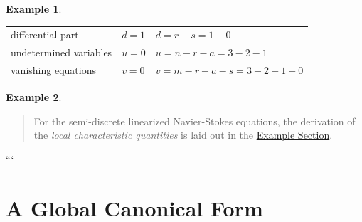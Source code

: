 \documentclass[]{book}
\newenvironment {JHSAYS} [0] {\begin{quote}\color{jhsc}} {\end{quote}}
\theoremstyle{definition}
\theoremstyle{definition}
\newtheorem{example}{Example}[chapter]
\theoremstyle{definition}
\theoremstyle{definition}
\theoremstyle{remark}
\begin{document}
\begin{example}
\begin{longtable}[]{@{}lll@{}}
\begin{minipage}[t]{0.20\columnwidth}\raggedright
differential part\strut
\end{minipage} & \begin{minipage}[t]{0.24\columnwidth}\raggedright
\(d=1\)\strut
\end{minipage} & \begin{minipage}[t]{0.47\columnwidth}\raggedright
\(d=r-s=1-0\)\strut
\end{minipage}\tabularnewline
\begin{minipage}[t]{0.20\columnwidth}\raggedright
undetermined variables\strut
\end{minipage} & \begin{minipage}[t]{0.24\columnwidth}\raggedright
\(u=0\)\strut
\end{minipage} & \begin{minipage}[t]{0.47\columnwidth}\raggedright
\(u=n-r-a=3-2-1\)\strut
\end{minipage}\tabularnewline
\begin{minipage}[t]{0.20\columnwidth}\raggedright
vanishing equations\strut
\end{minipage} & \begin{minipage}[t]{0.24\columnwidth}\raggedright
\(v=0\)\strut
\end{minipage} & \begin{minipage}[t]{0.47\columnwidth}\raggedright
\(v=m-r-a-s=3-2-1-0\)\strut
\end{minipage}\tabularnewline
\bottomrule
\end{longtable}
\end{example}

\begin{example}
\protect\hypertarget{exm:strangeness-in-the-nse}{}{\label{exm:strangeness-in-the-nse} }
\end{example}

\begin{JHSAYS}
For the semi-discrete linearized Navier-Stokes equations, the derivation
of the \emph{local characteristic quantities} is laid out in the
\protect\hyperlink{x-nse-local-char-vals}{Example Section}.
\end{JHSAYS}

```

\hypertarget{IV-Global-Canonical-Form}{%
\section{A Global Canonical Form}\label{IV-Global-Canonical-Form}}
\end{document}
